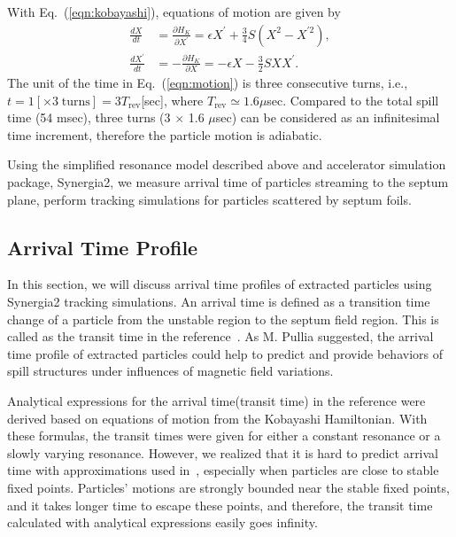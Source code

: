 \documentclass[aps,prstab,onecolumn,preprint,endfloats,11pt]{revtex4-1}
\begin{document}
With Eq.~(\ref{eqn:kobayashi}), equations of motion are given by
\begin{equation}
 \begin{split}
  \frac{dX}{dt} & = \frac{\partial H_{K}}{\partial X^{\prime}}
                  = \epsilon X^{\prime} + \frac{3}{4} S
                    \left(
                      X^{2} - X^{\prime 2}
                    \right), \\
  \frac{dX^{\prime}}{dt} & = - \frac{\partial H_{K}}{\partial X}
                           = - \epsilon X - \frac{3}{2} S X X^{\prime}.
 \end{split}
\label{eqn:motion}
\end{equation}
The unit of the time in Eq.~(\ref{eqn:motion}) is three consecutive turns, i.e., $t = 1 [\times 3 \; \text{turns}] = 3 T_{\text{rev}}$[sec], where $T_{\text{rev}} \simeq 1.6 \mu$sec.
Compared to the total spill time (54 msec), three turns (3 $\times$ 1.6 $\mu$sec) can be considered as an infinitesimal time increment, therefore the particle motion is adiabatic. 

Using the simplified resonance model described above and accelerator simulation package, Synergia2, we measure arrival time of particles streaming to the septum plane, perform tracking simulations for particles scattered by septum foils.


\subsection{\label{sec:arrival}Arrival Time Profile}

In this section, we will discuss arrival time profiles of extracted particles using Synergia2 tracking simulations. An arrival time is defined as a transition time change of a particle from the unstable region to the septum field region. This is called as the transit time in the reference~\cite{pullia}. As M. Pullia suggested, the arrival time profile of extracted particles could help to predict and provide behaviors of spill structures under influences of magnetic field variations.

Analytical expressions for the arrival time(transit time) in the reference \cite{pullia} were derived based on equations of motion from the Kobayashi Hamiltonian. With these formulas, the transit times were given for either a constant resonance or a slowly varying resonance. However, we realized that it is hard to predict arrival time with approximations used in~\cite{pullia}, especially when particles are close to stable fixed points. Particles' motions are strongly bounded near the stable fixed points, and it takes longer time to escape these points, and therefore, the transit time calculated with analytical expressions easily goes infinity.
\end{document}
